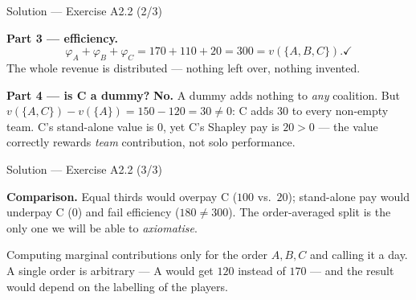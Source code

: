 \documentclass[aspectratio=169,11pt]{beamer}
\begin{document}
\begin{frame}{Solution --- Exercise A2.2 (2/3)}
\begin{solutionbox}
  \textbf{Part 3 --- efficiency.}
  \[
    \varphi_A+\varphi_B+\varphi_C = 170+110+20 = 300 = v(\{A,B,C\}). \checkmark
  \]
  The whole revenue is distributed --- nothing left over, nothing invented.

  \medskip
  \textbf{Part 4 --- is C a dummy?} \textbf{No.} A dummy adds nothing to \emph{any}
  coalition. But $v(\{A,C\})-v(\{A\}) = 150-120 = 30 \neq 0$: C adds $30$ to every
  non-empty team. C's stand-alone value is $0$, yet C's Shapley pay is $20>0$ ---
  the value correctly rewards \emph{team} contribution, not solo performance.
\end{solutionbox}
\end{frame}

\begin{frame}{Solution --- Exercise A2.2 (3/3)}
\begin{solutionbox}
  \medskip
  \textbf{Comparison.} Equal thirds would overpay C ($100$ vs.\ $20$); stand-alone
  pay would underpay C ($0$) and fail efficiency ($180\ne300$). The order-averaged
  split is the only one we will be able to \emph{axiomatise}.
\end{solutionbox}
\begin{mistake}
  Computing marginal contributions only for the order $A,B,C$ and calling it a day.
  A single order is arbitrary --- A would get $120$ instead of $170$ --- and the
  result would depend on the labelling of the players.
\end{mistake}
\end{frame}
\end{document}
